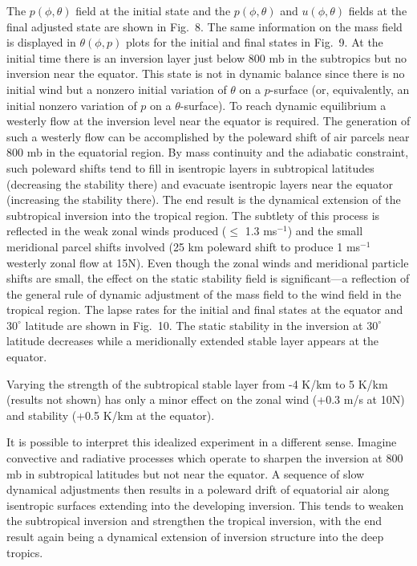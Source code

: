      The $p(\phi,\theta)$ field at the initial state and the $p(\phi,\theta)$
and $u(\phi,\theta)$ fields at the final adjusted state are shown in Fig.~8. 
The same information on the mass field is displayed in $\theta(\phi,p)$ plots
for the initial and final states in Fig.~9.  At the initial time there is an
inversion layer just below 800 mb in the subtropics but no inversion near the
equator.  This state is not in dynamic balance since there is no initial wind
but a nonzero initial variation of $\theta$ on a $p$-surface (or,
equivalently, an initial nonzero variation of $p$ on a $\theta$-surface).  To
reach dynamic equilibrium a westerly flow at the inversion level near the
equator is required.  The generation of such a westerly flow can be
accomplished by the poleward shift of air parcels near 800 mb in the
equatorial region.  By mass continuity and the adiabatic constraint, such
poleward shifts tend to fill in isentropic layers in subtropical latitudes
(decreasing the stability there) and evacuate isentropic layers near the
equator (increasing the stability there).  The end result is the dynamical
extension of the subtropical inversion into the tropical region.  The subtlety
of this process is reflected in the weak zonal winds produced ($\leq$ 1.3
ms$^{-1}$) and the small meridional parcel shifts involved (25 km poleward
shift to produce
1 ms$^{-1}$ westerly zonal flow at 15N).  Even though the zonal winds and
meridional particle shifts are small, the effect on the static stability field
is significant---a reflection of the general rule of dynamic adjustment of the
mass field to the wind field in the tropical region. The lapse rates for the
initial and final states at the equator and $30^\circ$ latitude are shown in
Fig.~10.  The static stability in the inversion at $30^\circ$ latitude
decreases while a meridionally extended stable layer appears at the equator.

Varying the strength of the subtropical stable layer from -4 K/km to 5 K/km
(results not shown) has only a minor effect on the zonal wind (+0.3 m/s at
10N) and stability (+0.5 K/km at the equator).

     It is possible to interpret this idealized experiment in a different
sense.  Imagine convective and radiative processes which operate to sharpen
the inversion at 800 mb in subtropical latitudes but not near the equator.  A
sequence of slow dynamical adjustments then results in a poleward drift of
equatorial air along isentropic surfaces extending into the developing
inversion.  This tends to weaken the subtropical inversion and strengthen the
tropical inversion, with the end result again being a dynamical extension of
inversion structure into the deep tropics.


